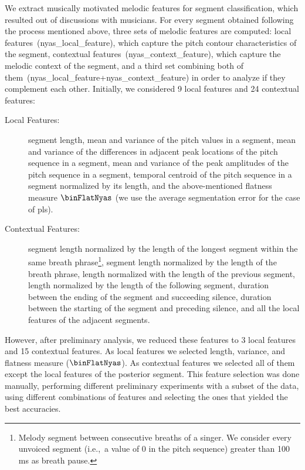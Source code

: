 {We extract musically motivated melodic features for segment classification, which resulted out of discussions with musicians. For every segment obtained following the process mentioned above, three sets of melodic features are computed: local features~(\acrshort{nyas_local_feature}), which capture the pitch contour characteristics of the segment, contextual features~(\acrshort{nyas_context_feature}), which capture the melodic context of the segment, and a third set combining both of them~(\acrshort{nyas_local_feature}+\acrshort{nyas_context_feature}) in order to analyze if they complement each other. Initially, we considered 9 local features and 24 contextual features:

\begin{description}
	\item[Local Features:] segment length, mean and variance of the pitch values in a segment, mean and variance of the differences in adjacent peak locations of the pitch sequence in a segment, mean and variance of the peak amplitudes of the pitch sequence in a segment, temporal centroid of the pitch sequence in a segment normalized by its length, and the above-mentioned flatness measure $\binFlatNyas$ (we use the average segmentation error for the case of \gls{pls}).
	\item[Contextual Features:] segment length normalized by the length of the longest segment within the same breath phrase\footnote{Melody segment between consecutive breaths of a singer. We consider every unvoiced segment (i.e.,~a value of 0 in the pitch sequence) greater than 100\,ms as breath pause.}, segment length normalized by the length of the breath phrase, length normalized with the length of the previous segment, length normalized by the length of the following segment, duration between the ending of the segment and succeeding silence, duration between the starting of the segment and preceding silence, and all the local features of the adjacent segments.
\end{description}

However, after preliminary analysis, we reduced these features to 3 local features and 15 contextual features. As local features we selected length, variance, and flatness measure ($\binFlatNyas$). As contextual features we selected all of them except the local features of the posterior segment. This feature selection was done manually, performing different preliminary experiments with a subset of the data, using different combinations of features and selecting the ones that yielded the best accuracies.

}

